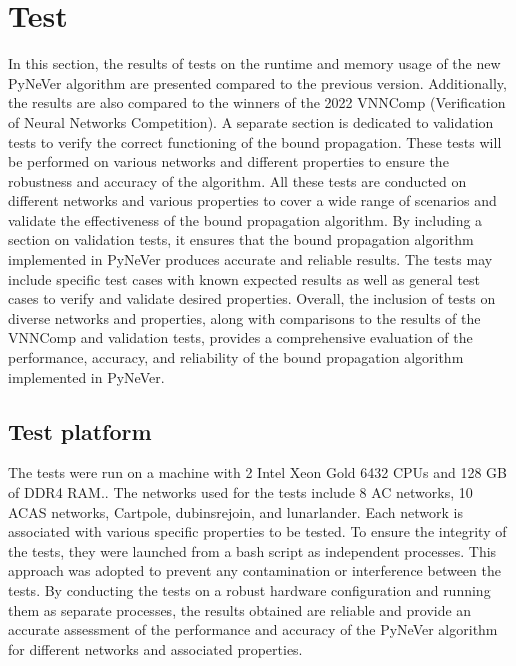 \section{Test}

In this section, the results of tests on the runtime and memory usage of the new PyNeVer algorithm are presented compared to the previous version. Additionally, the results are also compared to the winners of the 2022 VNNComp (Verification of Neural Networks Competition).
A separate section is dedicated to validation tests to verify the correct functioning of the bound propagation. These tests will be performed on various networks and different properties to ensure the robustness and accuracy of the algorithm.
All these tests are conducted on different networks and various properties to cover a wide range of scenarios and validate the effectiveness of the bound propagation algorithm.
By including a section on validation tests, it ensures that the bound propagation algorithm implemented in PyNeVer produces accurate and reliable results. The tests may include specific test cases with known expected results as well as general test cases to verify and validate desired properties.
Overall, the inclusion of tests on diverse networks and properties, along with comparisons to the results of the VNNComp and validation tests, provides a comprehensive evaluation of the performance, accuracy, and reliability of the bound propagation algorithm implemented in PyNeVer.
\subsection{Test platform}
The tests were run on a machine with 2 Intel Xeon Gold 6432 CPUs and 128 GB of DDR4 RAM.. The networks used for the tests include 8 AC networks, 10 ACAS networks, Cartpole, dubinsrejoin, and lunarlander. Each network is associated with various specific properties to be tested.
To ensure the integrity of the tests, they were launched from a bash script as independent processes. This approach was adopted to prevent any contamination or interference between the tests.
By conducting the tests on a robust hardware configuration and running them as separate processes, the results obtained are reliable and provide an accurate assessment of the performance and accuracy of the PyNeVer algorithm for different networks and associated properties.
